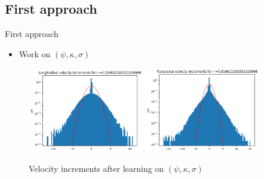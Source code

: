 \documentclass[11pt]{beamer}
\begin{document}
\subsection{First approach}
\begin{frame}{First approach}
  \begin{itemize}
    \item Work on $(\psi,\kappa,\sigma)$
  \end{itemize}
  \begin{figure}
    \centering
    \includegraphics[width=0.45\textwidth]{VelIncrPSIKAPPASIGMA/VelIncrLong.png}
    \includegraphics[width=0.45\textwidth]{VelIncrPSIKAPPASIGMA/VelIncrTrans.png}
    \caption{Velocity increments after learning on $(\psi,\kappa,\sigma)$}
  \end{figure}
\end{frame}
\end{document}
